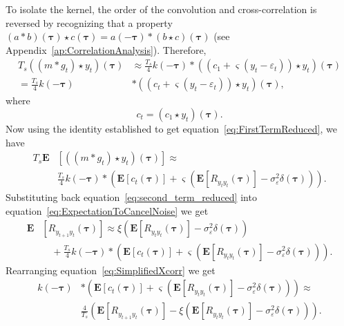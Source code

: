 \documentclass[10pt,twocolumn,twoside]{IEEEtran}
\begin{document}
To isolate the kernel, the order of the convolution and cross-correlation is reversed by recognizing that a property $(a \ast b)(\boldsymbol\tau) \star c(\boldsymbol\tau) = a(-\boldsymbol\tau)\ast(b \star c)(\boldsymbol\tau)$ (see Appendix~\ref{ap:CorrelationAnalysis}).
Therefore,
\begin{align}
	T_s((m \ast g_t) \star y_t)(\boldsymbol\tau) &\approx \frac{T_s}{4} k(-\boldsymbol\tau) \ast ((c_1 + \varsigma (y_t - \varepsilon_t)) \star y_t)(\boldsymbol\tau) \nonumber\\
	= \frac{T_s}{4}k(-\boldsymbol\tau) & \ast (( c_t + \varsigma (y_t - \varepsilon_t)) \star y_t) (\boldsymbol\tau),
\end{align}
where
\begin{equation}
	c_t = (c_1\star y_t)(\boldsymbol\tau).
\end{equation}  
Now using the identity established to get equation~\eqref{eq:FirstTermReduced}, we have
\begin{align}\label{eq:second_term_reduced}
	T_s\mathbf{E}&\left[((m \ast g_t) \star y_t)(\boldsymbol\tau)\right] \approx \nonumber \\
	&\frac{T_s}{4} k(-\boldsymbol\tau) \ast (\mathbf{E}\left[c_t(\boldsymbol\tau)\right] + \varsigma (\mathbf{E}\left[R_{y_ty_t}(\boldsymbol\tau)\right] - \sigma_{\varepsilon}^2 \delta(\boldsymbol\tau))).
\end{align}
Substituting back equation~\eqref{eq:second_term_reduced} into equation~\eqref{eq:ExpectationToCancelNoise} we get
\begin{align}\label{eq:SimplifiedXcorr}
	\mathbf{E}&[R_{y_{t+1}y_t}(\boldsymbol{\tau})] \approx \xi\left(\mathbf{E}[ R_{y_ty_t}(\boldsymbol{\tau})] - \sigma_{\varepsilon}^2 \delta(\boldsymbol{\tau})\right) \nonumber \\
	&\quad+ \frac{T_s}{4} k(-\boldsymbol\tau) \ast (\mathbf{E}\left[c_t(\boldsymbol\tau)\right] + \varsigma (\mathbf{E}\left[R_{y_ty_t}(\boldsymbol\tau)\right] - \sigma_{\varepsilon}^2 \delta(\boldsymbol\tau))).
\end{align}
Rearranging equation~\eqref{eq:SimplifiedXcorr} we get
\begin{align} \label{eq:Tobesolvedforthekernel}
	k(-\boldsymbol\tau) & \ast (\mathbf{E}\left[c_t(\boldsymbol\tau)\right] + \varsigma (\mathbf{E}\left[R_{y_ty_t}(\boldsymbol\tau)\right] - \sigma_{\varepsilon}^2 \delta(\boldsymbol\tau))) \approx  \nonumber \\
	& \frac{4}{T_s}(\mathbf{E}[R_{y_{t+1}y_t}(\boldsymbol{\tau})] - \xi\left(\mathbf{E}[ R_{y_ty_t}(\boldsymbol{\tau})] - \sigma_{\varepsilon}^2 \delta(\boldsymbol{\tau})\right)).
\end{align}
\end{document}
